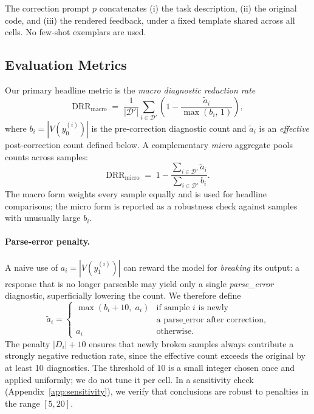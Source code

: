 The correction prompt $p$ concatenates (i) the task description, (ii) the original code, and (iii) the rendered feedback, under a fixed template shared across all cells. No few-shot exemplars are used.

\subsection{Evaluation Metrics}
\label{sec:metrics}

Our primary headline metric is the \emph{macro diagnostic reduction rate}
\begin{equation}
\label{eq:drr-macro}
    \mathrm{DRR}_{\text{macro}} \;=\; \frac{1}{|\mathcal{D}'|} \sum_{i \in \mathcal{D}'} \left(1 - \frac{\widetilde{a}_i}{\max(b_i,\,1)}\right),
\end{equation}
where $b_i = |V(y_0^{(i)})|$ is the pre-correction diagnostic count and $\widetilde{a}_i$ is an \emph{effective} post-correction count defined below. A complementary \emph{micro} aggregate pools counts across samples:
\begin{equation}
\label{eq:drr-micro}
    \mathrm{DRR}_{\text{micro}} \;=\; 1 - \frac{\sum_{i \in \mathcal{D}'} \widetilde{a}_i}{\sum_{i \in \mathcal{D}'} b_i}.
\end{equation}
The macro form weights every sample equally and is used for headline comparisons; the micro form is reported as a robustness check against samples with unusually large $b_i$.

\paragraph{Parse-error penalty.}
A naive use of $a_i = |V(y_1^{(i)})|$ can reward the model for \emph{breaking} its output: a response that is no longer parseable may yield only a single \textit{parse\_error} diagnostic, superficially lowering the count. We therefore define
\begin{equation}
\label{eq:penalty}
\widetilde{a}_i = \begin{cases}
    \max\!\left(b_i + 10,\; a_i\right) & \text{if sample } i \text{ is newly} \\[-2pt]
    & \text{a parse\_error after correction,} \\
    a_i & \text{otherwise.}
\end{cases}
\end{equation}
The penalty $|D_i| + 10$ ensures that newly broken samples always contribute a strongly negative reduction rate, since the effective count exceeds the original by at least 10 diagnostics. The threshold of $10$ is a small integer chosen once and applied uniformly; we do not tune it per cell. In a sensitivity check (Appendix~\ref{app:sensitivity}), we verify that conclusions are robust to penalties in the range $[5, 20]$.

